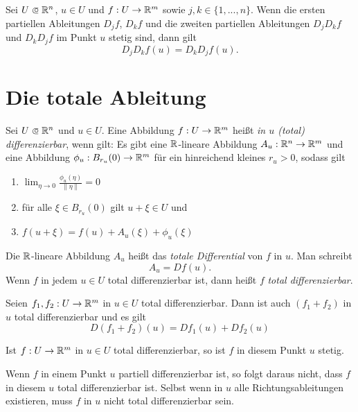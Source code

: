 \documentclass{cheat-sheet}
\newcommand\opn{\mathrel{\ooalign{$\subset$\cr
  \hidewidth\raise.1ex\hbox{$\circ\mkern.5mu$}\cr}}}
\begin{document}
\begin{samepage}

\begin{satz}
Sei $U \opn \R^n$, $u \in U$ und $f : U \to \mathbb{R}^m$ sowie $j, k \in \{ 1, ..., n \}$. Wenn die ersten partiellen Ableitungen $D_j f$, $D_k f$ und die zweiten partiellen Ableitungen $D_j D_k f$ und $D_k D_j f$ im Punkt $u$ stetig sind, dann gilt
\[ D_j D_k f(u) = D_k D_j f(u). \]
\end{satz}



\section{Die totale Ableitung}

\end{samepage}

\begin{defn}
Sei $U \opn \R^n$ und $u \in U$. Eine Abbildung $f : U \to \mathbb{R}^m$ heißt \emph{in $u$ (total) differenzierbar}, wenn gilt: Es gibt eine $\mathbb{R}$-lineare Abbildung $A_u : \mathbb{R}^n \to \mathbb{R}^m$ und eine Abbildung $\phi_u : B_{r_u}(0) \to \mathbb{R}^m$ für ein hinreichend kleines $r_u > 0$, sodass gilt
\begin{enumerate}
  \item $\lim_{\eta \to 0} \tfrac{ \phi_u(\eta) }{ \| \eta \| } = 0$
  \item für alle $\xi \in B_{r_u}(0)$ gilt $u + \xi \in U$ und
  \item $f(u + \xi) = f(u) + A_u(\xi) + \phi_u(\xi)$
\end{enumerate}
Die $\mathbb{R}$-lineare Abbildung $A_u$ heißt das \emph{totale Differential} von $f$ in $u$. Man schreibt
\[ A_u = D f(u). \]
Wenn $f$ in jedem $u \in U$ total differenzierbar ist, dann heißt $f$ \emph{total differenzierbar}.
\end{defn}

\begin{bem}
Seien $f_1, f_2 : U \to \mathbb{R}^m$ in $u \in U$ total differenzierbar. Dann ist auch $(f_1 + f_2)$ in $u$ total differenzierbar und es gilt
\[ D (f_1 + f_2)(u) = D f_1(u) + D f_2(u) \]
\end{bem}

\begin{satz}
Ist $f : U \to \mathbb{R}^m$ in $u \in U$ total differenzierbar, so ist $f$ in diesem Punkt $u$ stetig.
\end{satz}

\begin{acht}
Wenn $f$ in einem Punkt $u$ partiell differenzierbar ist, so folgt daraus nicht, dass $f$ in diesem $u$ total differenzierbar ist. Selbst wenn in $u$ alle Richtungsableitungen existieren, muss $f$ in $u$ nicht total differenzierbar sein.
\end{acht}
\end{document}
